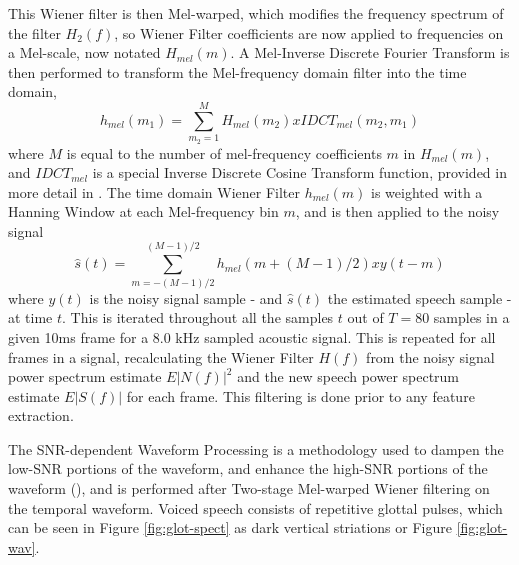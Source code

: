 This Wiener filter is then Mel-warped, which modifies the frequency spectrum of the filter $H_2(f)$, so Wiener Filter coefficients are now applied to frequencies on a Mel-scale, now notated $H_{mel}(m)$.  A Mel-Inverse Discrete Fourier Transform is then performed to transform the Mel-frequency domain filter into the time domain, \begin{equation} h_{mel}(m_1) = \sum_{m_2=1}^{M} H_{mel}(m_2) x IDCT_{mel}(m_2,m_1) \end{equation} where $M$ is equal to the number of mel-frequency coefficients $m$ in $H_{mel}(m)$, and $IDCT_{mel}$ is a special Inverse Discrete Cosine Transform function, provided in more detail in \cite{etsi:02}.  The time domain Wiener Filter $h_{mel}(m)$ is weighted with a Hanning Window at each Mel-frequency bin $m$, and is then applied to the noisy signal \begin{equation} \hat{s}(t) = \sum_{m=-(M-1)/2}^{(M-1)/2} h_{mel}(m+(M-1)/2) x y(t-m) \end{equation} where $y(t)$ is the noisy signal sample - and $\hat{s}(t)$ the estimated speech sample - at time $t$.  This is iterated throughout all the samples $t$ out of $T=80$ samples in a given 10ms frame for a 8.0 kHz sampled acoustic signal.  This is repeated for all frames in a signal, recalculating the Wiener Filter $H(f)$ from the noisy signal power spectrum estimate $E|N(f)|^2$ and the new speech power spectrum estimate $E|S(f)|$ for each frame.  This filtering is done prior to any feature extraction.

The SNR-dependent Waveform Processing is a methodology used to dampen the low-SNR portions of the waveform, and enhance the high-SNR portions of the waveform (\cite{macho:01}), and is performed after Two-stage Mel-warped Wiener filtering on the temporal waveform.  Voiced speech consists of repetitive glottal pulses, which can be seen in Figure \ref{fig:glot-spect} as dark vertical striations or Figure \ref{fig:glot-wav}.


